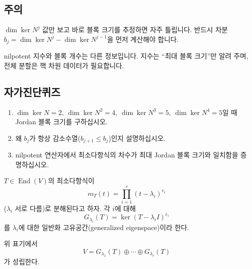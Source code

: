 \subsection*{주의}
\begin{warning}
$\dim\ker N^j$ 값만 보고 바로 블록 크기를 추정하면 자주 틀립니다. 반드시 차분 $b_j=\dim\ker N^j-\dim\ker N^{j-1}$을 먼저 계산해야 합니다.
\end{warning}
\begin{warning}
nilpotent 지수와 블록 개수는 다른 정보입니다. 지수는 ``최대 블록 크기''만 알려 주며, 전체 분할은 핵 차원 데이터가 필요합니다.
\end{warning}

\subsection*{자가진단퀴즈}
\begin{enumerate}[label=\arabic*.]
\item $\dim\ker N=2,\ \dim\ker N^2=4,\ \dim\ker N^3=5,\ \dim\ker N^4=5$일 때 Jordan 블록 크기를 구하십시오.
\item 왜 $b_j$가 항상 감소수열($b_{j+1}\le b_j$)인지 설명하십시오.
\item nilpotent 연산자에서 최소다항식의 차수가 최대 Jordan 블록 크기와 일치함을 증명하십시오.
\end{enumerate}


\begin{definition}
$T\in\operatorname{End}(V)$의 최소다항식이
$$
m_T(t)=\prod_{i=1}^r (t-\lambda_i)^{e_i}
$$
($\lambda_i$ 서로 다름)로 분해된다고 하자. 각 $i$에 대해
$$
G_{\lambda_i}(T)=\ker (T-\lambda_i I)^{e_i}
$$
를 $\lambda_i$에 대한 일반화 고유공간(generalized eigenspace)이라 한다.
\end{definition}

\begin{theorem}
위 표기에서
$$
V=G_{\lambda_1}(T)\oplus\cdots\oplus G_{\lambda_r}(T)
$$
가 성립한다.
\end{theorem}

